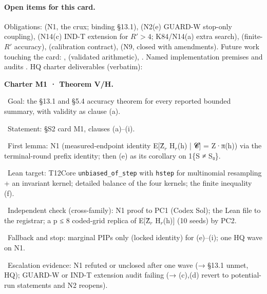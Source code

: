 \paragraph{Open items for this card.} Obligations:  (N1, the crux; binding §13.1),  (N2(e) GUARD-W stop-only coupling),  (N14(c) IND-T extension for $R'>4$; K84/N14(a) extra search),  (finite-$R'$ accuracy),  (calibration contract),  (N9, closed with amendments). Future work touching the card: ,  (validated arithmetic), . Named implementation premises and audits . HQ charter deliverables (verbatim):
\par\noindent \textbf{Charter M1 · Theorem V/H.}
\par\noindent \textbullet~Goal: the §13.1 and §5.4 accuracy theorem for every reported bounded summary, with validity as clause (a).
\par\noindent \textbullet~Statement: §S2 card M1, clauses (a)–(i).
\par\noindent \textbullet~First lemma: N1 (measured-endpoint identity E[Ẑ$_{r}$ H$_{r}$(h) | 𝓒] = Z·π(h)) via the terminal-round prefix identity; then (e) as its corollary on 1\{S ≠ S₀\}.
\par\noindent \textbullet~Lean target: T12Core \texttt{unbiased\_of\_step} with \texttt{hstep} for multinomial resampling + an invariant kernel; detailed balance of the four kernels; the finite inequality (f).
\par\noindent \textbullet~Independent check (cross-family): N1 proof to PC1 (Codex Sol); the Lean file to the registrar; a p ≤ 8 coded-grid replica of E[Ẑ$_{r}$ H$_{r}$(h)] (10 seeds) by PC2.
\par\noindent \textbullet~Fallback and stop: marginal PIPs only (locked identity) for (e)–(i); one HQ wave on N1.
\par\noindent \textbullet~Escalation evidence: N1 refuted or unclosed after one wave (→ §13.1 unmet, HQ); GUARD-W or IND-T extension audit failing (→ (c),(d) revert to potential-run statements and N2 reopens).

